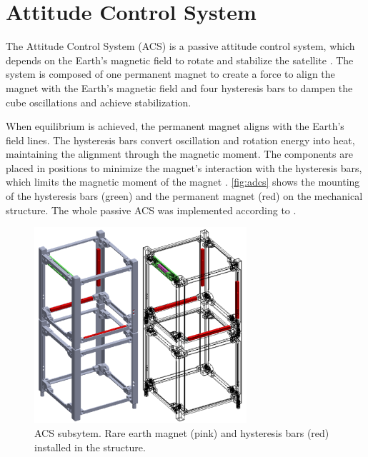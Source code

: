 \section{Attitude Control System}

The Attitude Control System (ACS) is a passive attitude control system, which depends on the Earth's magnetic field to rotate and stabilize the satellite \cite{santoni2009,gerhardt2010}. The system is composed of one permanent magnet to create a force to align the magnet with the Earth's magnetic field and four hysteresis bars to dampen the cube oscillations and achieve stabilization.

When equilibrium is achieved, the permanent magnet aligns with the Earth's field lines. The hysteresis bars convert oscillation and rotation energy into heat, maintaining the alignment through the magnetic moment. The components are placed in positions to minimize the magnet's interaction with the hysteresis bars, which limits the magnetic moment of the magnet \cite{francois2010}. \autoref{fig:adcs} shows the mounting of the hysteresis bars (green) and the permanent magnet (red) on the mechanical structure. The whole passive ACS was implemented according to \cite{francois2010}.

\begin{figure}[!ht]
    \begin{center}
        \includegraphics[width=0.7\textwidth]{figures/adcs}
        \caption{ACS subsytem. Rare earth magnet (pink) and hysteresis bars (red) installed in the structure.}
        \label{fig:adcs}
    \end{center}
\end{figure}

